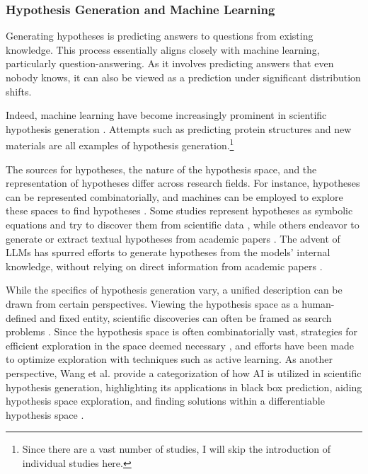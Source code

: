 \subsubsection{Hypothesis Generation and Machine Learning}
Generating hypotheses is predicting answers to questions from existing knowledge. This process essentially aligns closely with machine learning, particularly question-answering. As it involves predicting answers that even nobody knows, it can also be viewed as a prediction under significant distribution shifts.

Indeed, machine learning have become increasingly prominent in scientific hypothesis generation \cite{xu2021artificial,zhang2023artificial,wang2023scientific}. Attempts such as predicting protein structures \cite{jumper2021highly} and new materials \cite{merchant2023scaling} are all examples of hypothesis generation.\footnote{
Since there are a vast number of studies, I will skip the introduction of individual studies here.
}

The sources for hypotheses, the nature of the hypothesis space, and the representation of hypotheses differ across research fields. For instance, hypotheses can be represented combinatorially, and machines can be employed to explore these spaces to find hypotheses \cite{coley2020autonomous}. Some studies represent hypotheses as symbolic equations and try to discover them from scientific data \cite{kramer2023automated}, while others endeavor to generate or extract textual hypotheses from academic papers \cite{kang2022augmenting,chan2018solvent,wang2023learning,xu2023exploring,yang2023large}. The advent of LLMs has spurred efforts to generate hypotheses from the models' internal knowledge, without relying on direct information from academic papers \cite{park2023can,ai4science2023impact}.

While the specifics of hypothesis generation vary, a unified description can be drawn from certain perspectives. Viewing the hypothesis space as a human-defined and fixed entity, scientific discoveries can often be framed as search problems \cite{coley2020autonomous}. 
Since the hypothesis space is often combinatorially vast, strategies for efficient exploration in the space deemed necessary \cite{coley2020autonomousII,zenil2023future}, and efforts have been made to optimize exploration with techniques such as active learning. As another perspective, Wang et al. provide a categorization of how AI is utilized in scientific hypothesis generation, highlighting its applications in black box prediction, aiding hypothesis space exploration, and finding solutions within a differentiable hypothesis space \cite{wang2023scientific}.

